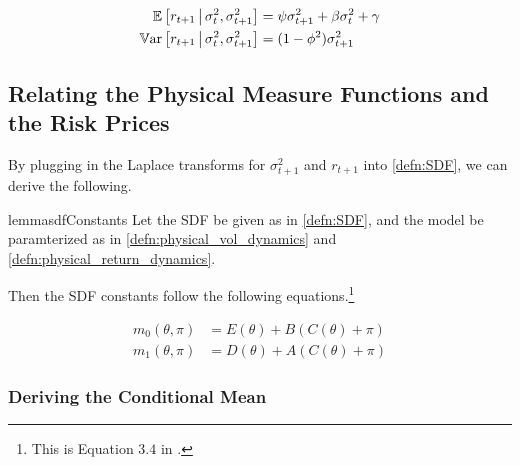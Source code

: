 \documentclass[11pt, letterpaper, twoside, final]{article}
\begin{document}
\begin{align}
  \label{eqn:rtn_cond_mean}
  \operatorname{\mathbb{E}}\left[r_{t+1} \,\middle\vert\, \sigma^2_t, \sigma^2_{t+1}\right] &= \psi \sigma^2_{t+1} + \beta \sigma^2_t +
  \gamma \\
  \label{eqn:rtn_cond_vol}
  \operatorname{\mathbb{V}ar}\left[r_{t+1} \,\middle\vert\, \sigma^2_t, \sigma^2_{t+1}\right] &= (1 - \phi^2) \sigma^2_{t+1} 
\end{align}



\subsection{Relating the Physical Measure Functions and the Risk Prices}

By plugging in the Laplace transforms for $\sigma^2_{t+1}$ and $r_{t+1}$ into \cref{defn:SDF}, we can derive the following.

\begin{restatable}{lemma}{sdfConstants}
  \label{lemma:characterizing_sdf_integration_constants}
  Let the SDF be given as in \cref{defn:SDF}, and the model be paramterized as in
  \cref{defn:physical_vol_dynamics} and \cref{defn:physical_return_dynamics}.

  Then the SDF constants follow the following equations.\footnote{This is Equation $3.4$ in
  \textcite[3.4]{khrapov2016affine}.}

  \begin{align}
    \label{eqn:sdf_functions_vs_physical_functions}
    m_0(\theta, \pi) &= E(\theta) + B(C(\theta) + \pi) \\
    m_1(\theta, \pi) &= D(\theta) + A(C(\theta) + \pi) \nonumber
  \end{align}

\end{restatable}



\subsubsection{Deriving the Conditional Mean}
\end{document}
